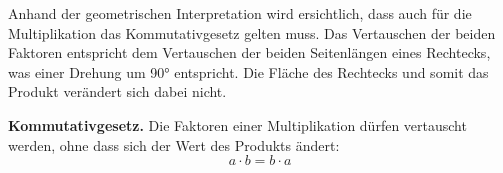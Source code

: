 Anhand der geometrischen Interpretation wird ersichtlich, dass auch für die Multiplikation das Kommutativgesetz gelten muss. Das Vertauschen der beiden Faktoren entspricht dem Vertauschen der beiden Seitenlängen eines Rechtecks, was einer Drehung um \ang{90} entspricht. Die Fläche des Rechtecks und somit das Produkt verändert sich dabei nicht.
\begin{center}
\end{center}
\begin{theorem}
\textbf{Kommutativgesetz.} Die Faktoren einer Multiplikation dürfen vertauscht werden, ohne dass sich der Wert des Produkts ändert:
\[
  a \cdot b = b \cdot a
\]
\end{theorem}

